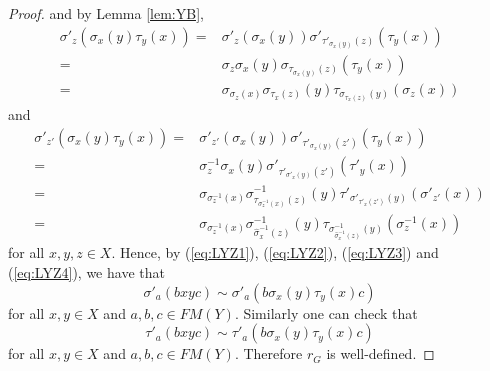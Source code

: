 \begin{proof}
and by Lemma \ref{lem:YB},
\begin{align}\label{eq:LYZ3}
    \sigma'_z(\sigma_x(y)\tau_y(x))=&\sigma'_z(\sigma_x(y))\sigma'_{\tau'_{\sigma_x(y)}(z)}(\tau_y(x))\nonumber\\
    =&\sigma_z\sigma_x(y)\sigma_{\tau_{\sigma_x(y)}(z)}(\tau_y(x))\nonumber\\
    =&\sigma_{\sigma_z(x)}\sigma_{\tau_x(z)}(y)\tau_{\sigma_{\tau_x(z)}(y)}(\sigma_z(x))
\end{align}
and 
\begin{align}\label{eq:LYZ4}
    \sigma'_{z'}(\sigma_x(y)\tau_y(x))=&\sigma'_{z'}(\sigma_x(y))\sigma'_{\tau'_{\sigma_x(y)}(z')}(\tau_y(x))\nonumber\\
    =&\sigma^{-1}_z\sigma_x(y)\sigma'_{\tau'_{\sigma'_x(y)}(z')}(\tau'_y(x))\nonumber\\
    =&\sigma_{\sigma^{-1}_z(x)}\sigma^{-1}_{\tau_{\sigma^{-1}_z(x)}(z)}(y)\tau'_{\sigma'_{\tau'_x(z')}(y)}(\sigma'_{z'}(x))\nonumber\\
    =&\sigma_{\sigma^{-1}_z(x)}\sigma^{-1}_{\widehat{\sigma}^{-1}_x(z)}(y)\tau_{\sigma^{-1}_{\widehat{\sigma}^{-1}_x(z)}(y)}(\sigma^{-1}_{z}(x))
\end{align}
for all $x,y,z\in X$. 
Hence, by (\ref{eq:LYZ1}), (\ref{eq:LYZ2}), (\ref{eq:LYZ3}) and (\ref{eq:LYZ4}), we have that 
\[\sigma'_{a}(bxyc)\sim \sigma'_a(b\sigma_x(y)\tau_y(x)c)\]
for all $x,y\in X$ and $a,b,c\in FM(Y)$. Similarly one can check that
\[\tau'_{a}(bxyc)\sim \tau'_a(b\sigma_x(y)\tau_y(x)c)\]
for all $x,y\in X$ and $a,b,c\in FM(Y)$. Therefore $r_G$ is well-defined. 


\end{proof}
